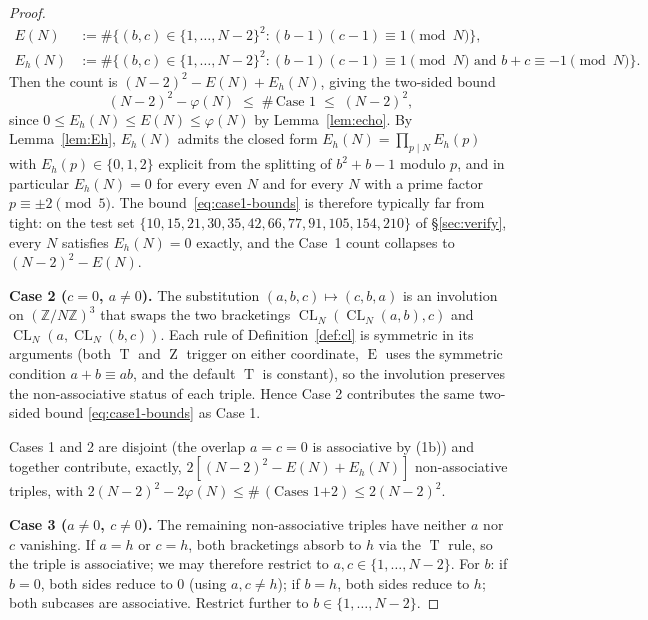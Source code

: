 \documentclass[11pt,reqno]{amsart}
\theoremstyle{plain}
\theoremstyle{definition}
\theoremstyle{remark}
\DeclareMathOperator{\CL}{CL}
\DeclareMathOperator{\ECHO}{E}
\DeclareMathOperator{\HARM}{T}
\DeclareMathOperator{\VOID}{Z}
\newcommand{\ZN}{\mathbb{Z}/N\mathbb{Z}}
\begin{document}
\begin{proof}
\begin{align}
  E(N)   &:= \#\{(b,c)\in\{1,\dots,N-2\}^{2}:(b-1)(c-1)\equiv 1\pmod N\},
  \label{eq:Edef}\\
  E_{h}(N) &:= \#\{(b,c)\in\{1,\dots,N-2\}^{2}:(b-1)(c-1)\equiv 1\pmod N
            \text{ and }b+c\equiv -1\pmod N\}.
  \label{eq:Ehdef}
\end{align}
Then the count is $(N-2)^{2}-E(N)+E_{h}(N)$, giving the two-sided bound
\begin{equation}\label{eq:case1-bounds}
  (N-2)^{2}-\varphi(N)\;\le\;\#\,\text{Case 1}\;\le\;(N-2)^{2},
\end{equation}
since $0\le E_{h}(N)\le E(N)\le\varphi(N)$ by Lemma~\ref{lem:echo}.
By Lemma~\ref{lem:Eh}, $E_{h}(N)$ admits the closed form
$E_{h}(N)=\prod_{p\mid N}E_{h}(p)$ with $E_{h}(p)\in\{0,1,2\}$
explicit from the splitting of $b^{2}+b-1$ modulo $p$, and in
particular $E_{h}(N)=0$ for every even $N$ and for every $N$ with a
prime factor $p\equiv\pm 2\pmod 5$. The bound~\eqref{eq:case1-bounds}
is therefore typically far from tight: on the test set
$\{10,15,21,30,35,42,66,77,91,105,154,210\}$ of \S\ref{sec:verify},
every $N$ satisfies $E_{h}(N)=0$ exactly, and the Case~1 count
collapses to $(N-2)^{2}-E(N)$.

\medskip
\noindent\textbf{Case 2 ($c=0$, $a\neq 0$).} The substitution
$(a,b,c)\mapsto(c,b,a)$ is an involution on $(\ZN)^{3}$ that swaps
the two bracketings $\CL_N(\CL_N(a,b),c)$ and $\CL_N(a,\CL_N(b,c))$.
Each rule of Definition~\ref{def:cl} is symmetric in its arguments
(both $\HARM$ and $\VOID$ trigger on either coordinate, $\ECHO$ uses
the symmetric condition $a+b\equiv ab$, and the default $\HARM$ is
constant), so the involution preserves the non-associative status of
each triple. Hence Case 2 contributes the same two-sided bound
\eqref{eq:case1-bounds} as Case 1.

Cases 1 and 2 are disjoint (the overlap $a=c=0$ is associative by
(1b)) and together contribute, exactly,
$2[(N-2)^{2}-E(N)+E_{h}(N)]$ non-associative triples, with
$2(N-2)^{2}-2\varphi(N)\le\#\,(\text{Cases 1+2})\le 2(N-2)^{2}$.

\medskip
\noindent\textbf{Case 3 ($a\neq 0$, $c\neq 0$).} The remaining
non-associative triples have neither $a$ nor $c$ vanishing. If
$a=h$ or $c=h$, both bracketings absorb to $h$ via the $\HARM$
rule, so the triple is associative; we may therefore restrict to
$a,c\in\{1,\dots,N-2\}$. For $b$: if $b=0$, both sides reduce to
$0$ (using $a,c\neq h$); if $b=h$, both sides reduce to $h$;
both subcases are associative. Restrict further to
$b\in\{1,\dots,N-2\}$.


\end{proof}
\end{document}
